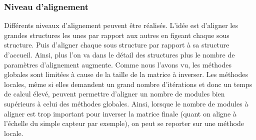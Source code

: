 











% 
   
   \subsubsection{Niveau d'alignement}
   
   Diff\'erents niveaux d'alignement peuvent \^etre r\'ealis\'es. L'id\'ee est d'aligner les grandes structures les unes par rapport aux autres en figeant chaque sous structure. Puis d'aligner chaque sous structure par rapport \`a sa structure d'accueil. Ainsi, plus l'on va dans le d\'etail des structures plus le nombre de param\`etres d'alignement augmente. Comme nous l'avons vu, les m\'ethodes globales sont limit\'ees \`a cause de la taille de la matrice \`a inverser. Les m\'ethodes locales, m\^eme si elles demandent un grand nombre d'it\'erations et donc un temps de calcul \'elev\'e, peuvent permettre d'aligner un nombre de modules bien sup\'erieurs \`a celui des m\'ethodes globales. Ainsi, lorsque le nombre de modules \`a aligner est trop important pour inverser la matrice finale (quant on aligne \`a l'\'echelle du simple capteur par exemple), on peut se reporter sur une m\'ethode locale.
   
